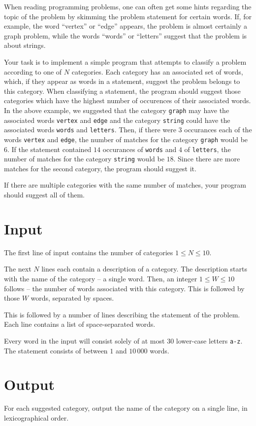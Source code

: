 When reading programming problems, one can often get some hints regarding the topic of the problem by skimming the problem statement for certain words.
If, for example, the word ``vertex'' or ``edge'' appears, the problem is almost certainly a graph problem, while the words ``words'' or ``letters'' suggest that the problem is about strings.

Your task is to implement a simple program that attempts to classify a problem according to one of $N$ categories.
Each category has an associated set of words, which, if they appear as words in a statement, suggest the problem belongs to this category.
When classifying a statement, the program should suggest those categories which have the highest number of occurences of their associated words.
In the above example, we suggested that the category \texttt{graph} may have the associated words \texttt{vertex} and \texttt{edge} and the category \texttt{string} could have the associated words \texttt{words} and \texttt{letters}.
Then, if there were $3$ occurances each of the words \texttt{vertex} and \texttt{edge}, the number of matches for the category \texttt{graph} would be $6$.
If the statement contained $14$ occurances of \texttt{words} and $4$ of \texttt{letters}, the number of matches for the category \texttt{string} would be $18$.
Since there are more matches for the second category, the program should suggest it.

If there are multiple categories with the same number of matches, your program should suggest all of them.

\section*{Input}
The first line of input contains the number of categories $1 \le N \le 10$.

The next $N$ lines each contain a description of a category.
The description starts with the name of the category -- a single word.
Then, an integer $1 \le W \le 10$ follows -- the number of words associated with this category.
This is followed by those $W$ words, separated by spaces.

This is followed by a number of lines describing the statement of the problem.
Each line contains a list of space-separated words.

Every word in the input will consist solely of at most $30$ lower-case letters \texttt{a-z}.
The statement consists of between $1$ and $10\,000$ words.

\section*{Output}
For each suggested category, output the name of the category on a single line, in lexicographical order.
